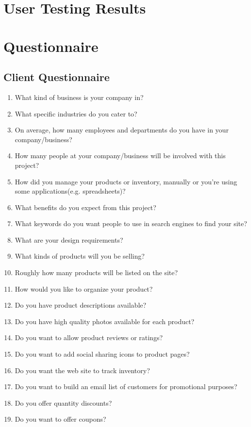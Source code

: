 \documentclass{report}
\begin{document}
\newpage


\chapter{User Testing Results}

\chapter{Questionnaire}
\section{Client Questionnaire}
\begin{enumerate}
\item What kind of business is your company in?
\item What specific industries do you cater to?
\item On average, how many employees and departments do you have in your
company/business?
\item How many people at your company/business will be involved with this project?
\item How did you manage your products or inventory, manually or you're using some
applications(e.g. spreadsheets)?
\item What benefits do you expect from this project?
\item What keywords do you want people to use in search engines to find your site?
\item What are your design requirements?
\item What kinds of products will you be selling?
\item Roughly how many products will be listed on the site?
\item How would you like to organize your product?
\item Do you have product descriptions available?
\item Do you have high quality photos available for each product?
\item Do you want to allow product reviews or ratings?
\item Do you want to add social sharing icons to product pages?
\item Do you want the web site to track inventory?
\item Do you want to build an email list of customers for promotional purposes?
\item Do you offer quantity discounts?
\item Do you want to offer coupons?

\end{enumerate}
\end{document}
